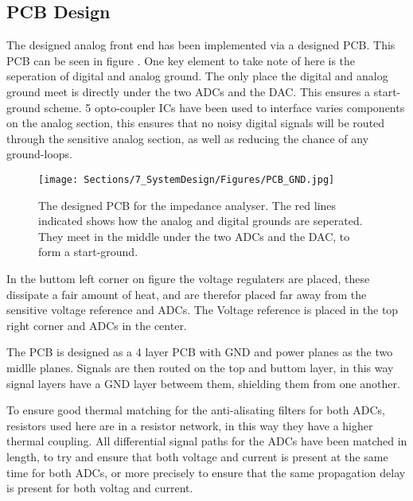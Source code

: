 \subsection{PCB Design} \label{subsec:PCBDesign}

The designed analog front end has been implemented via a designed PCB. This PCB can be seen in figure . One key element to take note of here is the seperation of digital and analog ground. The only place the digital and analog ground meet is directly under the two ADCs and the DAC. This ensures a start-ground scheme. 5 opto-coupler ICs have been used to interface varies components on the analog section, this ensures that no noisy digital signals will be routed through the sensitive analog section, as well as reducing the chance of any ground-loops. 

\begin{figure}[H]
   \centering
   \texttt{[image: Sections/7\_SystemDesign/Figures/PCB\_GND.jpg]}
   \caption{The designed PCB for the impedance analyser. The red lines indicated shows how the analog and digital grounds are seperated. They meet in the middle under the two ADCs and the DAC, to form a start-ground.}
   \label{fig_PCB}
\end{figure}

In the buttom left corner on figure  the voltage regulaters are placed, these dissipate a fair amount of heat, and are therefor placed far away from the sensitive voltage reference and ADCs. The Voltage reference is placed in the top right corner and ADCs in the center. 

The PCB is designed as a 4 layer PCB with GND and power planes as the two midlle planes. Signals are then routed on the top and buttom layer, in this way signal layers have a GND layer betweem them, shielding them from one another.

To ensure good thermal matching for the anti-alisating filters for both ADCs, resistors used here are in a resistor network, in this way they have a higher thermal coupling. All differential signal paths for the ADCs have been matched in length, to try and ensure that both voltage and current is present at the same time for both ADCs, or more precisely to ensure that the same propagation delay is present for both voltag and current.